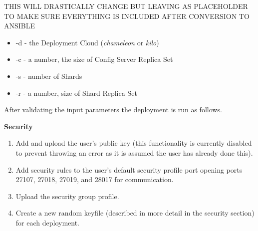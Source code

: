 \documentclass[9pt,twocolumn,twoside]{../../styles/osajnl}
\begin{document}
THIS WILL DRASTICALLY CHANGE BUT LEAVING AS PLACEHOLDER TO MAKE SURE EVERYTHING IS INCLUDED AFTER CONVERSION TO ANSIBLE

\vspace{-\topsep}
\begin{itemize}
\item -d - the Deployment Cloud (\emph{chameleon} or \emph{kilo})
\item -c - a number, the size of Config Server Replica Set
\item -s - number of Shards
\item -r - a number, size of Shard Replica Set
\end{itemize}
\vspace{-\topsep}

After validating the input parameters the deployment is run as follows.

\textbf{Security}
\vspace{-\topsep}
\begin{enumerate}
\item Add and upload the user's public key (this functionality is currently disabled to prevent throwing an error as it is assumed the user has already done this).
\item Add security rules to the user's default security profile port opening ports 27107, 27018, 27019, and 28017 for communication.
\item Upload the security group profile.
\item Create a new random keyfile (described in more detail in the security section) for each deployment.
\end{enumerate}
\vspace{-\topsep}
\end{document}
